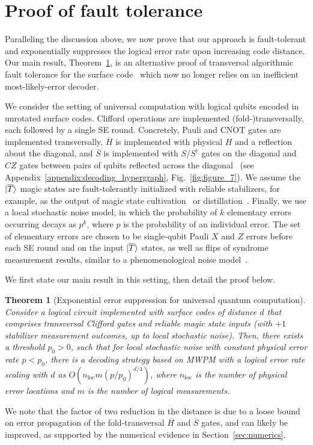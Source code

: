 \documentclass[prx,twocolumn,secnumarabic,balancelastpage,amsmath,amssymb,longbibliography]{revtex4-2}
\newtheorem{theorem}[thm]{Theorem}
\newcommand{\lop}[1]{\overline{#1}}
\newcommand{\lket}[1]{\ket{\overline{#1}}}
\newcommand{\lcnot}{\overline{\text{CNOT}}}
\begin{document}
\section{Proof of fault tolerance\label{sec:proof}}

Paralleling the discussion above, we now prove that our approach is fault-tolerant and exponentially suppresses the logical error rate upon increasing code distance.
%
Our main result, Theorem~\ref{thm:full_proof}, is an alternative proof of transversal algorithmic fault tolerance for the surface code~\cite{zhou2024algorithmic} which now no longer relies on an inefficient most-likely-error decoder.
%

We consider the setting of universal computation with logical qubits encoded in unrotated surface codes. 
%
Clifford operations are implemented (fold-)transversally, each followed by a single SE round.
%
Concretely, Pauli and $\lcnot$ gates are implemented transversally, $\lop{H}$ is implemented with physical $H$ and a reflection about the diagonal, and $\lop{S}$ is implemented with $S$/$S^\dagger$ gates on the diagonal and $CZ$ gates between pairs of qubits reflected across the diagonal~\cite{kubica2015unfolding,moussa2016transversal,guernut2024fault,chen2024transversal} (see Appendix~\ref{appendix:decoding_hypergraph}, Fig.~\ref{fig:figure_7}). 
%
We assume the $\lket{T}$ magic states are fault-tolerantly initialized with reliable stabilizers, for example, as the output of magic state cultivation~\cite{gidney2024magic} or distillation~\cite{bravyi2005universal}.
%
Finally, we use a local stochastic noise model, in which the probability of $k$ elementary errors occurring decays as $p^k$, where $p$ is the probability of an individual error. 
%
The set of elementary errors are chosen to be single-qubit Pauli $X$ and $Z$ errors before each SE round and on the input $\lket{T}$ states, as well as flips of syndrome measurement results, similar to a phenomenological noise model~\cite{dennis2002topological, fowler2012surface}.

We first state our main result in this setting, then detail the proof below. 
\begin{theorem}[Exponential error suppression for universal quantum computation]
\label{thm:full_proof}
Consider a logical circuit implemented with surface codes of distance $d$ that comprises transversal Clifford gates and reliable magic state inputs (with $+1$ stabilizer measurement outcomes, up to local stochastic noise).
%
Then, there exists a threshold $p_0 > 0$, such that for local stochastic noise with constant physical error rate $p < p_0$, there is a decoding strategy based on MWPM with a logical error rate scaling with $d$ as $O(n_{\mathrm{loc}} m(p/p_0)^{d/4})$, where $n_{\mathrm{loc}}$ is the number of physical error locations and $m$ is the number of logical measurements.
\end{theorem}
\noindent 
We note that the factor of two reduction in the distance is due to a loose bound on error propagation of the fold-transversal $\lop{H}$ and $\lop{S}$ gates, and can likely be improved, as supported by the numerical evidence in Section~\ref{sec:numerics}.
\end{document}
